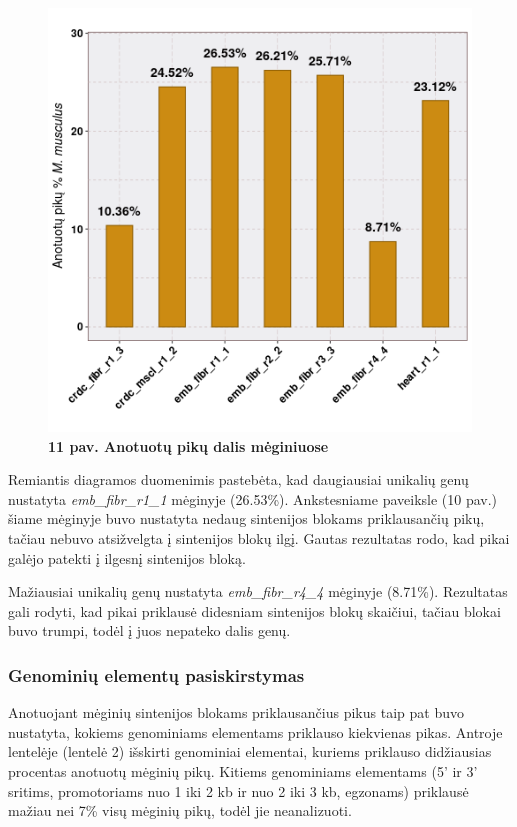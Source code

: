 \documentclass[12pt]{article}
\begin{document}
\begin{figure}[htb]
    \begin{center}
        \includegraphics[width=0.7\linewidth]{../Figures/Unique_genes_MM.png}
        \vspace{-2\baselineskip}
        \caption*{\small\textbf{11 pav. Anotuotų pikų dalis mėginiuose}}
        \label{fig:11}
    \end{center}
\end{figure}

Remiantis diagramos duomenimis pastebėta, kad daugiausiai unikalių genų
nustatyta \emph{emb\_\-fibr\_r1\_1} mėginyje (26.53\%). Ankstesniame paveiksle
(10 pav.) šiame mėginyje buvo nustatyta nedaug sintenijos blokams priklausančių
pikų, tačiau nebuvo atsižvelgta į sintenijos blokų ilgį. Gautas rezultatas rodo,
kad pikai galėjo patekti į ilgesnį sintenijos bloką.

Mažiausiai unikalių genų nustatyta \emph{emb\_fibr\_r4\_4} mėginyje (8.71\%).
Rezultatas gali rodyti, kad pikai priklausė didesniam sintenijos blokų skaičiui,
tačiau blokai buvo trumpi, todėl į juos nepateko dalis genų.

\newpage

\subsubsection{Genominių elementų pasiskirstymas}
Anotuojant mėginių sintenijos blokams priklausančius pikus taip pat buvo
nustatyta, kokiems genominiams elementams priklauso kiekvienas pikas. Antroje
lentelėje (lentelė 2) išskirti genominiai elementai, kuriems priklauso
didžiausias procentas anotuotų mėginių pikų. Kitiems genominiams elementams
(5' ir 3' sritims, promotoriams nuo 1 iki 2 kb ir nuo 2 iki 3 kb, egzonams)
priklausė mažiau nei 7\% visų mėginių pikų, todėl jie neanalizuoti.
\end{document}
